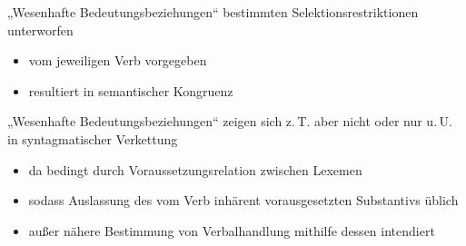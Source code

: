 \begin{frame}{„Wesenhafte Bedeutungsbeziehungen“}
\onslide<+->
bestimmten Selektionsrestriktionen unterworfen
\begin{itemize}[<+->]
	\item		vom jeweiligen Verb vorgegeben
	\item		resultiert in semantischer Kongruenz
\end{itemize}
\onslide<+->
\Zeile
\begin{exe}
	\ex\label{ex:wesenhafte.bedeutungsbeziehungen-002}
    \begin{xlist}
		\onslide<+->
	\end{xlist}
	\onslide<+->
	\ex\label{ex:wesenhafte.bedeutungsbeziehungen-003}
    \begin{xlist}
		\onslide<+->
	\end{xlist}
\end{exe}
\end{frame}

\begin{frame}{„Wesenhafte Bedeutungsbeziehungen“}
\onslide<+->
zeigen sich z.\,T. aber nicht oder nur u.\,U. in syntagmatischer Verkettung
\begin{itemize}[<+->]
	\item		da bedingt durch Voraussetzungsrelation zwischen Lexemen
	\item		sodass Auslassung des vom Verb inhärent vorausgesetzten Substantivs üblich
	\item		außer nähere Bestimmung von Verbalhandlung mithilfe dessen intendiert
\end{itemize}
\onslide<+->
\Zeile
\begin{exe}
	\ex\label{ex:wesenhafte.bedeutungsbeziehungen-004}
    \begin{xlist}
		\onslide<+->
	\end{xlist}
	\onslide<+->
	\ex\label{ex:wesenhafte.bedeutungsbeziehungen-005}
    \begin{xlist}
		\onslide<+->
	\end{xlist}
\end{exe}
\end{frame}

